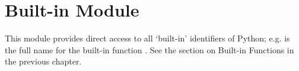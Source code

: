 \section{Built-in Module }

This module provides direct access to all `built-in' identifiers of
Python; e.g.  is the full name for the built-in
function .  See the section on Built-in Functions in the
previous chapter.
